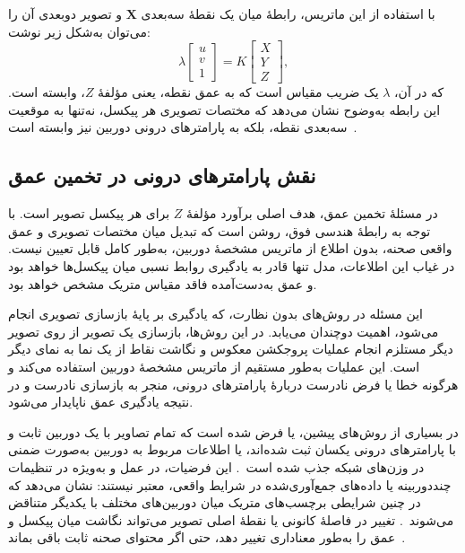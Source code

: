 با استفاده از این ماتریس، رابطهٔ میان یک نقطهٔ سه‌بعدی $\mathbf{X}$ و تصویر دوبعدی آن را می‌توان به‌شکل زیر نوشت:
\begin{equation}
\lambda
\begin{bmatrix}
u \\ v \\ 1
\end{bmatrix}
=
K
\begin{bmatrix}
X \\ Y \\ Z
\end{bmatrix},
\end{equation}
که در آن، $\lambda$ یک ضریب مقیاس است که به عمق نقطه، یعنی مؤلفهٔ $Z$، وابسته است. این رابطه به‌وضوح نشان می‌دهد که مختصات تصویری هر پیکسل، نه‌تنها به موقعیت سه‌بعدی نقطه، بلکه به پارامترهای درونی دوربین نیز وابسته است~\cite{HartleyZisserman2004}.

\subsection{نقش پارامترهای درونی در تخمین عمق}

در مسئلهٔ تخمین عمق، هدف اصلی برآورد مؤلفهٔ $Z$ برای هر پیکسل تصویر است. با توجه به رابطهٔ هندسی فوق، روشن است که تبدیل میان مختصات تصویری و عمق واقعی صحنه، بدون اطلاع از ماتریس مشخصهٔ دوربین، به‌طور کامل قابل تعیین نیست. در غیاب این اطلاعات، مدل تنها قادر به یادگیری روابط نسبی میان پیکسل‌ها خواهد بود و عمق به‌دست‌آمده فاقد مقیاس متریک مشخص خواهد بود.

این مسئله در روش‌های بدون نظارت، که یادگیری بر پایهٔ بازسازی تصویری انجام می‌شود، اهمیت دوچندان می‌یابد. در این روش‌ها، بازسازی یک تصویر از روی تصویر دیگر مستلزم انجام عملیات پروجکشن معکوس و نگاشت نقاط از یک نما به نمای دیگر است. این عملیات به‌طور مستقیم از ماتریس مشخصهٔ دوربین استفاده می‌کند و هرگونه خطا یا فرض نادرست دربارهٔ پارامترهای درونی، منجر به بازسازی نادرست و در نتیجه یادگیری عمق ناپایدار می‌شود.

در بسیاری از روش‌های پیشین، یا فرض شده است که تمام تصاویر با یک دوربین ثابت و با پارامترهای درونی یکسان ثبت شده‌اند، یا اطلاعات مربوط به دوربین به‌صورت ضمنی در وزن‌های شبکه جذب شده است~\cite{Eigen2014Depth,Godard2019Digging,DepthAnythingV2}. این فرضیات، در عمل و به‌ویژه در تنظیمات چنددوربینه یا داده‌های جمع‌آوری‌شده در شرایط واقعی، معتبر نیستند:  نشان می‌دهد که در چنین شرایطی برچسب‌های متریک میان دوربین‌های مختلف با یکدیگر متناقض می‌شوند~\cite{Yin2023Metric3D}. تغییر در فاصلهٔ کانونی یا نقطهٔ اصلی تصویر می‌تواند نگاشت میان پیکسل و عمق را به‌طور معناداری تغییر دهد، حتی اگر محتوای صحنه ثابت باقی بماند~\cite{Facil2019CAMConvs}.

